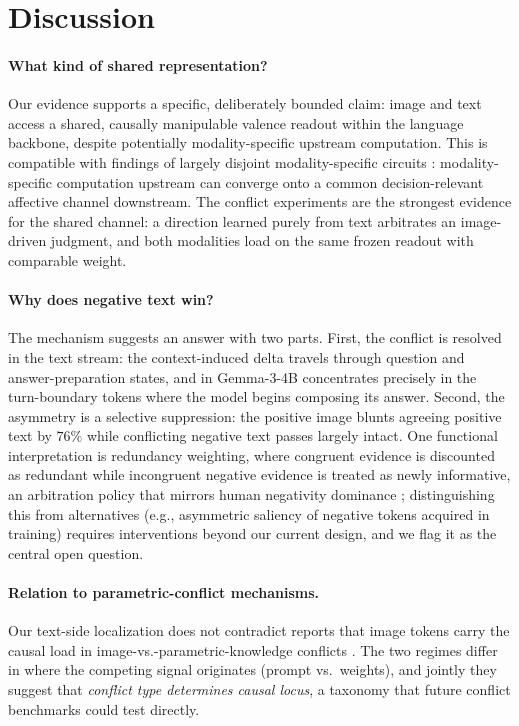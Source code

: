 \documentclass{article}
\newcommand{\gemma}{Gemma-3-4B}
\begin{document}
\section{Discussion}
\label{sec:discussion}

\paragraph{What kind of shared representation?}
Our evidence supports a specific, deliberately bounded claim: image and text access a shared, causally manipulable valence readout within the language backbone, despite potentially modality-specific upstream computation. This is compatible with findings of largely disjoint modality-specific circuits \citep{nikankin2025}: modality-specific computation upstream can converge onto a common decision-relevant affective channel downstream. The conflict experiments are the strongest evidence for the shared channel: a direction learned purely from text arbitrates an image-driven judgment, and both modalities load on the same frozen readout with comparable weight.

\paragraph{Why does negative text win?}
The mechanism suggests an answer with two parts. First, the conflict is resolved in the text stream: the context-induced delta travels through question and answer-preparation states, and in \gemma{} concentrates precisely in the turn-boundary tokens where the model begins composing its answer. Second, the asymmetry is a selective suppression: the positive image blunts agreeing positive text by $76\%$ while conflicting negative text passes largely intact. One functional interpretation is redundancy weighting, where congruent evidence is discounted as redundant while incongruent negative evidence is treated as newly informative, an arbitration policy that mirrors human negativity dominance \citep{rozin2001}; distinguishing this from alternatives (e.g., asymmetric saliency of negative tokens acquired in training) requires interventions beyond our current design, and we flag it as the central open question.

\paragraph{Relation to parametric-conflict mechanisms.}
Our text-side localization does not contradict reports that image tokens carry the causal load in image-vs.-parametric-knowledge conflicts \citep{nooralahzadeh2026, lietzow2026}. The two regimes differ in where the competing signal originates (prompt vs.\ weights), and jointly they suggest that \emph{conflict type determines causal locus}, a taxonomy that future conflict benchmarks could test directly.
\end{document}
